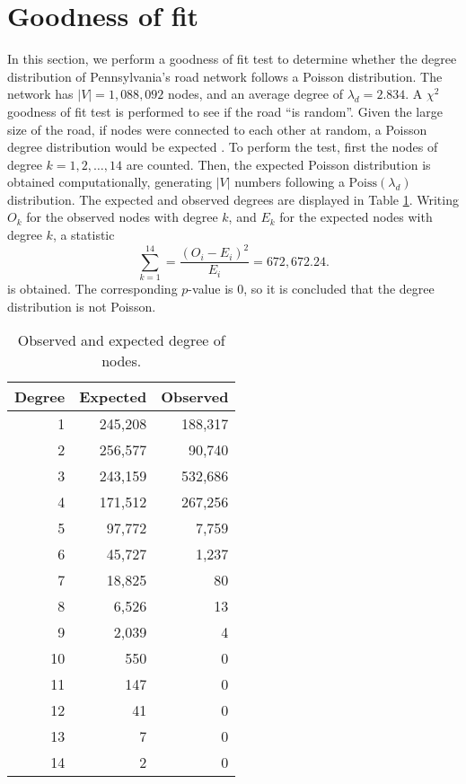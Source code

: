 \documentclass[letterpaper, 10 pt, conference]{article}
\newcommand\ql{\textquotedblleft}
\newcommand\qr{\textquotedblright}
\begin{document}
\section{Goodness of fit}
In this section, we perform a goodness of fit test to determine whether the degree distribution of Pennsylvania's road network \citep{snapnets} follows a Poisson distribution. The network has $|V| = 1,088,092$ nodes, and an average degree of $\lambda_d = 2.834$. A $\chi^2$ goodness of fit test is performed to see if the road \ql is random\qr. Given the large size of the road, if nodes were connected to each other at random, a Poisson degree distribution would be expected \citep{Newman_2018}. To perform the test, first the nodes of degree $k = 1, 2, \dots, 14$ are counted. Then, the expected Poisson distribution is obtained computationally, generating $|V|$ numbers following a $\mathrm{Poiss}(\lambda_d)$ distribution. The expected and observed degrees are displayed in Table \ref{tab:deg_exp_obs}. Writing $O_k$ for the observed nodes with degree $k$, and $E_k$ for the expected nodes with degree $k$, a statistic  
\begin{equation}
	\sum_{k = 1}^{14} = \frac{(O_i - E_i)^2}{E_i} =  672,672.24.
\end{equation}
 is obtained. The corresponding $p$-value is 0, so it is concluded that the degree distribution is not Poisson. 
 
\begin{table}
	\centering
	\caption{Observed and expected degree of nodes.}
	\begin{tabular}{rrr}
		\hline
		Degree & Expected & Observed \\ 
		\hline
		1 & 245,208 & 188,317 \\ 
		2 & 256,577 & 90,740 \\ 
		3 & 243,159 & 532,686 \\ 
		4 & 171,512 & 267,256 \\ 
		5 & 97,772 & 7,759 \\ 
		6 & 45,727 & 1,237 \\ 
		7 & 18,825 &  80 \\ 
		8 & 6,526 &  13 \\ 
		9 & 2,039 &   4 \\ 
		10 & 550 &   0 \\ 
		11 & 147 &   0 \\ 
		12 &  41 &   0 \\ 
		13 &   7 &   0 \\ 
		14 &   2 &   0 \\ 
		\hline
	\end{tabular}
	\label{tab:deg_exp_obs}
\end{table}
\end{document}
